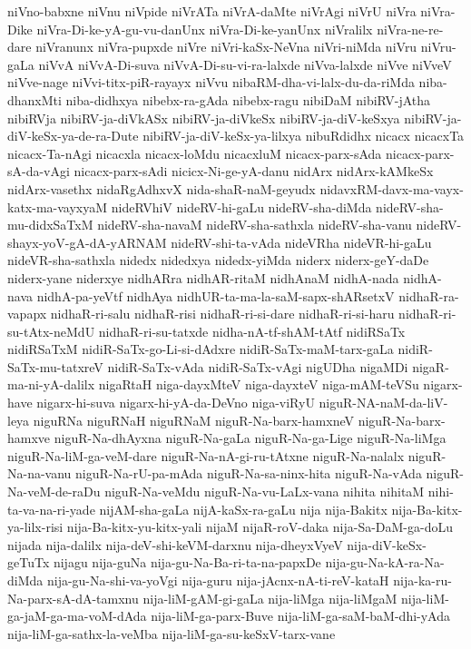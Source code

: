 {niVno-babxne
niVnu
niVpide
niVrATa
niVrA-daMte
niVrAgi
niVrU
niVra
niVra-Dike
niVra-Di-ke-yA-gu-vu-danUnx
niVra-Di-ke-yanUnx
niVralilx
niVra-ne-re-dare
niVranunx
niVra-pupxde
niVre
niVri-kaSx-NeVna
niVri-niMda
niVru
niVru-gaLa
niVvA
niVvA-Di-suva
niVvA-Di-su-vi-ra-lalxde
niVva-lalxde
niVve
niVveV
niVve-nage
niVvi-titx-piR-rayayx
niVvu
nibaRM-dha-vi-lalx-du-da-riMda
niba-dhanxMti
niba-didhxya
nibebx-ra-gAda
nibebx-ragu
nibiDaM
nibiRV-jAtha
nibiRVja
nibiRV-ja-diVkASx
nibiRV-ja-diVkeSx
nibiRV-ja-diV-keSxya
nibiRV-ja-diV-keSx-ya-de-ra-Dute
nibiRV-ja-diV-keSx-ya-lilxya
nibuRdidhx
nicacx
nicacxTa
nicacx-Ta-nAgi
nicacxla
nicacx-loMdu
nicacxluM
nicacx-parx-sAda
nicacx-parx-sA-da-vAgi
nicacx-parx-sAdi
nicicx-Ni-ge-yA-danu
nidArx
nidArx-kAMkeSx
nidArx-vasethx
nidaRgAdhxvX
nida-shaR-naM-geyudx
nidavxRM-davx-ma-vayx-katx-ma-vayxyaM
nideRVhiV
nideRV-hi-gaLu
nideRV-sha-diMda
nideRV-sha-mu-didxSaTxM
nideRV-sha-navaM
nideRV-sha-sathxla
nideRV-sha-vanu
nideRV-shayx-yoV-gA-dA-yARNAM
nideRV-shi-ta-vAda
nideVRha
nideVR-hi-gaLu
nideVR-sha-sathxla
nidedx
nidedxya
nidedx-yiMda
niderx
niderx-geY-daDe
niderx-yane
niderxye
nidhARra
nidhAR-ritaM
nidhAnaM
nidhA-nada
nidhA-nava
nidhA-pa-yeVtf
nidhAya
nidhUR-ta-ma-la-saM-sapx-shARsetxV
nidhaR-ra-vapapx
nidhaR-ri-salu
nidhaR-risi
nidhaR-ri-si-dare
nidhaR-ri-si-haru
nidhaR-ri-su-tAtx-neMdU
nidhaR-ri-su-tatxde
nidha-nA-tf-shAM-tAtf
nidiRSaTx
nidiRSaTxM
nidiR-SaTx-go-Li-si-dAdxre
nidiR-SaTx-maM-tarx-gaLa
nidiR-SaTx-mu-tatxreV
nidiR-SaTx-vAda
nidiR-SaTx-vAgi
nigUDha
nigaMDi
nigaR-ma-ni-yA-dalilx
nigaRtaH
niga-dayxMteV
niga-dayxteV
niga-mAM-teVSu
nigarx-have
nigarx-hi-suva
nigarx-hi-yA-da-DeVno
niga-viRyU
niguR-NA-naM-da-liV-leya
niguRNa
niguRNaH
niguRNaM
niguR-Na-barx-hamxneV
niguR-Na-barx-hamxve
niguR-Na-dhAyxna
niguR-Na-gaLa
niguR-Na-ga-Lige
niguR-Na-liMga
niguR-Na-liM-ga-veM-dare
niguR-Na-nA-gi-ru-tAtxne
niguR-Na-nalalx
niguR-Na-na-vanu
niguR-Na-rU-pa-mAda
niguR-Na-sa-ninx-hita
niguR-Na-vAda
niguR-Na-veM-de-raDu
niguR-Na-veMdu
niguR-Na-vu-LaLx-vana
nihita
nihitaM
nihi-ta-va-na-ri-yade
nijAM-sha-gaLa
nijA-kaSx-ra-gaLu
nija
nija-Bakitx
nija-Ba-kitx-ya-lilx-risi
nija-Ba-kitx-yu-kitx-yali
nijaM
nijaR-roV-daka
nija-Sa-DaM-ga-doLu
nijada
nija-dalilx
nija-deV-shi-keVM-darxnu
nija-dheyxVyeV
nija-diV-keSx-geTuTx
nijagu
nija-guNa
nija-gu-Na-Ba-ri-ta-na-papxDe
nija-gu-Na-kA-ra-Na-diMda
nija-gu-Na-shi-va-yoVgi
nija-guru
nija-jAcnx-nA-ti-reV-kataH
nija-ka-ru-Na-parx-sA-dA-tamxnu
nija-liM-gAM-gi-gaLa
nija-liMga
nija-liMgaM
nija-liM-ga-jaM-ga-ma-voM-dAda
nija-liM-ga-parx-Buve
nija-liM-ga-saM-baM-dhi-yAda
nija-liM-ga-sathx-la-veMba
nija-liM-ga-su-keSxV-tarx-vane
}
